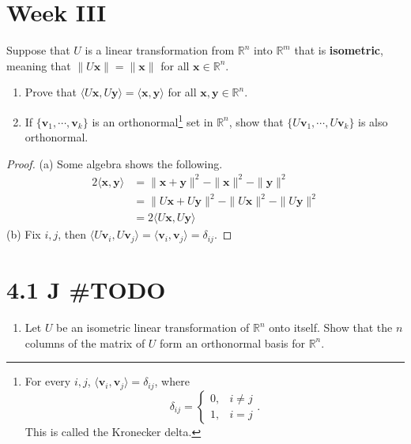\documentclass[../main.tex]{subfiles}
\begin{document}
\section{Week III}

\begin{problem}[\S4.1 I]
Suppose that $U$ is a linear transformation from $\mathbb{R}^n$ into $\mathbb{R}^m$ that is \textbf{isometric}, meaning that $\|U \mathbf{x}\| = \|\mathbf{x}\|$ for all $\mathbf{x} \in \mathbb{R}^n$.
\begin{enumerate}
    \item[(a)] Prove that $\langle U\mathbf{x}, U \mathbf{y} \rangle = \langle \mathbf{x}, \mathbf{y} \rangle$ for all $\mathbf{x}, \mathbf{y} \in \mathbb{R}^n$.
    \item[(b)] If $\{ \mathbf{v}_1, \cdots, \mathbf{v}_k \}$ is an orthonormal\footnote{
        For every $i, j$, $\langle \mathbf{v}_i, \mathbf{v}_j \rangle = \delta_{ij}$, where
        \[
            \delta_{ij} = \begin{cases}
                0, & i \ne j \\
                1, & i = j
            \end{cases}.
        \]
        This is called the Kronecker delta.
    }
        set in $\mathbb{R}^n$, show that $\{ U\mathbf{v}_1, \cdots, U\mathbf{v}_k \}$ is also orthonormal.
\end{enumerate}
\end{problem}

\begin{proof}
    (a) Some algebra shows the following.
    \begin{align*}
        2\langle \mathbf{x}, \mathbf{y} \rangle &= \|\mathbf{x} + \mathbf{y}\|^2 - \|\mathbf{x}\|^2 - \|\mathbf{y}\|^2 \\
         &= \|U\mathbf{x} + U\mathbf{y}\|^2 - \|U\mathbf{x}\|^2 - \|U\mathbf{y}\|^2 \\
         &= 2\langle U\mathbf{x}, U\mathbf{y} \rangle
    \end{align*}
    (b) Fix $i, j$, then $\langle U\mathbf{v}_i, U\mathbf{v}_j \rangle = \langle \mathbf{v}_i, \mathbf{v}_j \rangle = \delta_{ij}$.
\end{proof}

\section{4.1 J \#TODO}
\begin{problem}
\begin{enumerate}[label=(\alph*)]
	\item Let $U$ be an isometric linear transformation of $\mathbb{R}^n$ onto itself.
	      Show that the $n$ columns of the matrix of $U$ form an orthonormal basis for $\mathbb{R}^n$.
\end{enumerate}
\end{problem}
\end{document}
